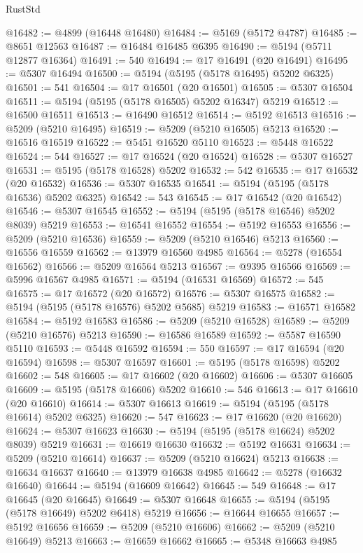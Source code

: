 \begin{lexlean}{RustStd}
\begin{coremodule}
@16482 := @4899 (@16448 @16480)
@16484 := @5169 (@5172 @4787)
@16485 := @8651 @12563
@16487 := @16484 @16485 @6395
@16490 := @5194 (@5711 @12877 @16364)
@16491 := 540
@16494 := @17 @16491 (@20 @16491)
@16495 := @5307 @16494
@16500 := @5194 (@5195 (@5178 @16495) @5202 @6325)
@16501 := 541
@16504 := @17 @16501 (@20 @16501)
@16505 := @5307 @16504
@16511 := @5194 (@5195 (@5178 @16505) @5202 @16347) @5219
@16512 := @16500 @16511
@16513 := @16490 @16512
@16514 := @5192 @16513
@16516 := @5209 (@5210 @16495)
@16519 := @5209 (@5210 @16505) @5213
@16520 := @16516 @16519
@16522 := @5451 @16520 @5110
@16523 := @5448 @16522
@16524 := 544
@16527 := @17 @16524 (@20 @16524)
@16528 := @5307 @16527
@16531 := @5195 (@5178 @16528) @5202
@16532 := 542
@16535 := @17 @16532 (@20 @16532)
@16536 := @5307 @16535
@16541 := @5194 (@5195 (@5178 @16536) @5202 @6325)
@16542 := 543
@16545 := @17 @16542 (@20 @16542)
@16546 := @5307 @16545
@16552 := @5194 (@5195 (@5178 @16546) @5202 @8039) @5219
@16553 := @16541 @16552
@16554 := @5192 @16553
@16556 := @5209 (@5210 @16536)
@16559 := @5209 (@5210 @16546) @5213
@16560 := @16556 @16559
@16562 := @13979 @16560 @4985
@16564 := @5278 (@16554 @16562)
@16566 := @5209 @16564 @5213
@16567 := @9395 @16566
@16569 := @5996 @16567 @4985
@16571 := @5194 (@16531 @16569)
@16572 := 545
@16575 := @17 @16572 (@20 @16572)
@16576 := @5307 @16575
@16582 := @5194 (@5195 (@5178 @16576) @5202 @5685) @5219
@16583 := @16571 @16582
@16584 := @5192 @16583
@16586 := @5209 (@5210 @16528)
@16589 := @5209 (@5210 @16576) @5213
@16590 := @16586 @16589
@16592 := @5587 @16590 @5110
@16593 := @5448 @16592
@16594 := 550
@16597 := @17 @16594 (@20 @16594)
@16598 := @5307 @16597
@16601 := @5195 (@5178 @16598) @5202
@16602 := 548
@16605 := @17 @16602 (@20 @16602)
@16606 := @5307 @16605
@16609 := @5195 (@5178 @16606) @5202
@16610 := 546
@16613 := @17 @16610 (@20 @16610)
@16614 := @5307 @16613
@16619 := @5194 (@5195 (@5178 @16614) @5202 @6325)
@16620 := 547
@16623 := @17 @16620 (@20 @16620)
@16624 := @5307 @16623
@16630 := @5194 (@5195 (@5178 @16624) @5202 @8039) @5219
@16631 := @16619 @16630
@16632 := @5192 @16631
@16634 := @5209 (@5210 @16614)
@16637 := @5209 (@5210 @16624) @5213
@16638 := @16634 @16637
@16640 := @13979 @16638 @4985
@16642 := @5278 (@16632 @16640)
@16644 := @5194 (@16609 @16642)
@16645 := 549
@16648 := @17 @16645 (@20 @16645)
@16649 := @5307 @16648
@16655 := @5194 (@5195 (@5178 @16649) @5202 @6418) @5219
@16656 := @16644 @16655
@16657 := @5192 @16656
@16659 := @5209 (@5210 @16606)
@16662 := @5209 (@5210 @16649) @5213
@16663 := @16659 @16662
@16665 := @5348 @16663 @4985

\end{coremodule}
\end{lexlean}
